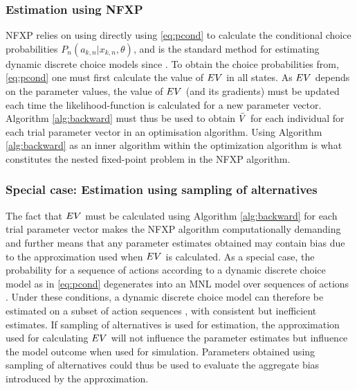 \subsubsection{Estimation using NFXP}
NFXP relies on using directly using \eqref{eq:pcond} to calculate the conditional choice probabilities $P_n(a_{k,n}|x_{k,n},\theta)$, and is the standard method for estimating dynamic discrete choice models since \citet{rust1987}. To obtain the choice probabilities from, \eqref{eq:pcond} one must first calculate the value of $EV$ in all states. As $EV$ depends on the parameter values, the value of $EV$ (and its gradients) must be updated each time the likelihood-function is calculated for a new parameter vector. Algorithm \ref{alg:backward} must thus be used to obtain $\bar{V}$ for each individual for each trial parameter vector in an optimisation algorithm. Using Algorithm \ref{alg:backward} as an inner algorithm within the optimization algorithm is what constitutes the nested fixed-point problem in the NFXP algorithm. 
\subsubsection{Special case: Estimation using sampling of alternatives}
\label{sec:estSampling}
The fact that $EV$ must be calculated using Algorithm \ref{alg:backward} for each trial parameter vector makes the NFXP algorithm computationally demanding and further means that any parameter estimates obtained may contain bias due to the approximation used when $EV$ is calculated. 
As a special case, the probability for a sequence of actions according to a dynamic discrete choice model as in \eqref{eq:pcond} degenerates into an MNL model over sequences of actions \citep{fosgerau2013}. Under these conditions, a dynamic discrete choice model can therefore be estimated on a subset of action sequences \citep{mcfadden1978}, with consistent but inefficient estimates. If sampling of alternatives is used for estimation, the approximation used for calculating $EV$ will not influence the parameter estimates but influence the model outcome when used for simulation. Parameters obtained using sampling of alternatives could thus be used to evaluate the aggregate bias introduced by the approximation.  

